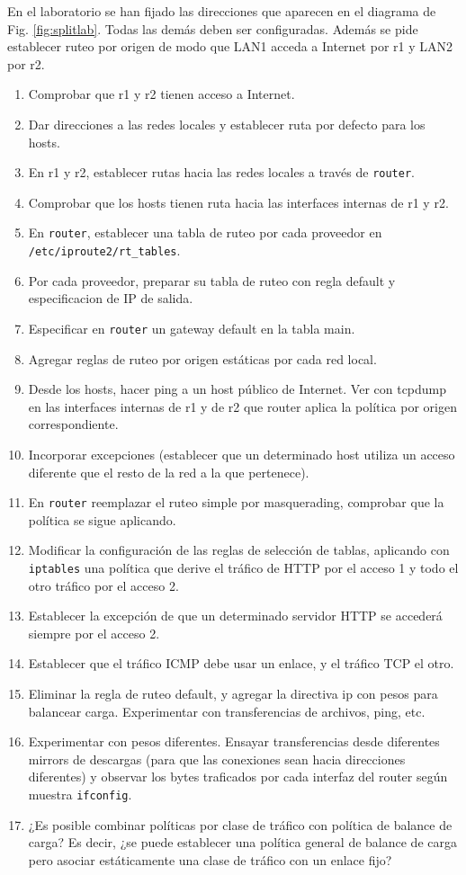En el laboratorio se han fijado las direcciones que aparecen en el diagrama de Fig. \ref{fig:splitlab}. Todas las demás deben ser configuradas. Además se pide establecer ruteo por origen de modo que LAN1 acceda a Internet por r1 y LAN2 por r2.
\begin{enumerate}
	\item Comprobar que r1 y r2 tienen acceso a Internet. 
	\item Dar direcciones a las redes locales y establecer ruta por defecto para los hosts. 
	\item En r1 y r2, establecer rutas hacia las redes locales a través de \texttt{router}. 
	\item Comprobar que los hosts tienen ruta hacia las interfaces internas de r1 y r2. 
	\item En \texttt{router}, establecer una tabla de ruteo por cada proveedor en \texttt{/etc/iproute2/rt\_tables}. 
	\item Por cada proveedor, preparar su tabla de ruteo con regla default y especificacion de IP de salida. 
	\item Especificar en \texttt{router} un gateway default en la tabla main. 
	\item Agregar reglas de ruteo por origen estáticas por cada red local. 
	\item Desde los hosts, hacer ping a un host público de Internet. Ver con tcpdump en las interfaces internas de r1 y de r2 que router  aplica la política por origen correspondiente. 
	\item Incorporar excepciones (establecer que un determinado host utiliza un acceso diferente que el resto de la red a la que pertenece).
	\item En \texttt{router} reemplazar el ruteo simple por masquerading, comprobar que la política se sigue aplicando. 
	\item Modificar la configuración de las reglas de selección de tablas, aplicando con \texttt{iptables} una política que derive el tráfico de HTTP por el acceso 1 y todo el otro tráfico por el acceso 2.
	\item Establecer la excepción de que un determinado servidor HTTP se accederá siempre por el acceso 2. 
	\item Establecer que el tráfico ICMP debe usar un enlace, y el tráfico TCP el otro.
	\item Eliminar la regla de ruteo default, y agregar la directiva ip con pesos para balancear carga. Experimentar con transferencias de archivos, ping, etc. 
	\item Experimentar con pesos diferentes. Ensayar transferencias desde diferentes mirrors de descargas (para que las conexiones sean hacia direcciones diferentes) y observar los bytes traficados por cada interfaz del router según muestra \texttt{ifconfig}. 
	\item ¿Es posible combinar políticas por clase de tráfico con política de balance de carga? Es decir, ¿se puede establecer una política general de balance de carga pero asociar estáticamente una clase de tráfico con un enlace fijo?
\end{enumerate}

